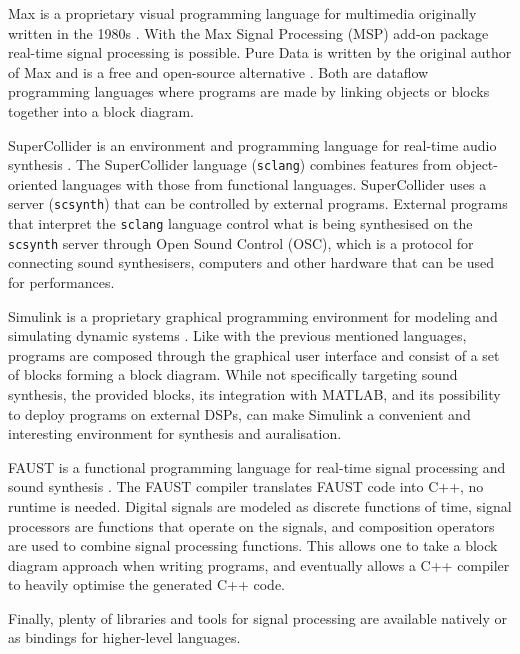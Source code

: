 Max is a proprietary visual programming language for multimedia originally
written in the 1980s \cite{Max2017}. With the Max Signal Processing (MSP) add-on
package real-time signal processing is possible. Pure Data is written by the
original author of Max and is a free and open-source alternative
\cite{PureData2017}. Both are dataflow programming languages where programs are
made by linking objects or blocks together into a block diagram.

SuperCollider is an environment and programming language for real-time audio
synthesis \cite{SuperCollider2017} . The SuperCollider language
(\texttt{sclang}) combines features from object-oriented languages with
those from functional languages. SuperCollider uses a server
(\texttt{scsynth}) that can be controlled by external programs. External
programs that interpret the \texttt{sclang} language control what is
being synthesised on the \texttt{scsynth} server through Open Sound
Control (OSC), which is a protocol for connecting sound synthesisers, computers
and other hardware that can be used for performances.

Simulink is a proprietary graphical programming environment for modeling and
simulating dynamic systems \cite{Simulink2017}. Like with the previous mentioned
languages, programs are composed through the graphical user interface and
consist of a set of blocks forming a block diagram. While not specifically
targeting sound synthesis, the provided blocks, its integration with MATLAB,
and its possibility to deploy programs on external DSPs, can make Simulink a
convenient and interesting environment for synthesis and auralisation.


FAUST is a functional programming language for real-time signal processing and
sound synthesis \cite{Faust2017}. The FAUST compiler translates FAUST code into
C++, no runtime is needed. Digital signals are modeled as discrete functions of
time, signal processors are functions that operate on the signals, and
composition operators are used to combine signal processing functions.
This allows one to take a block diagram approach when writing programs, and
eventually allows a C++ compiler to heavily optimise the generated C++ code.

Finally, plenty of libraries and tools for signal processing are available natively or as bindings
for higher-level languages.




